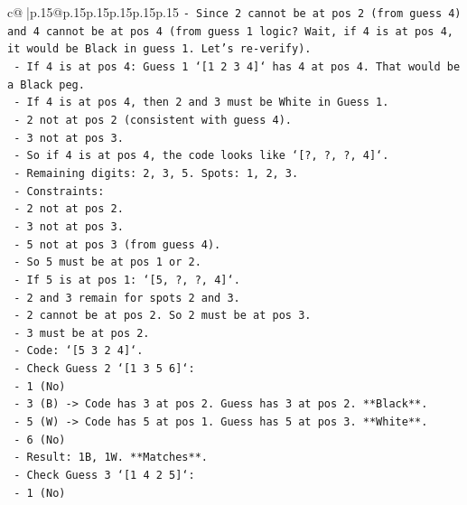 \documentclass{article}
\begin{document}
{\begin{supertabular}{c@{$\;$}|p{.15\linewidth}@{}p{.15\linewidth}p{.15\linewidth}p{.15\linewidth}p{.15\linewidth}p{.15\linewidth}}
{{{\texttt{{-}   Since 2 cannot be at pos 2 (from guess 4) and 4 cannot be at pos 4 (from guess 1 logic? Wait, if 4 is at pos 4, it would be Black in guess 1. Let's re{-}verify).} \\
\texttt{    {-}   If 4 is at pos 4: Guess 1 `{[}1 2 3 4{]}` has 4 at pos 4. That would be a Black peg.} \\
\texttt{    {-}   If 4 is at pos 4, then 2 and 3 must be White in Guess 1.} \\
\texttt{        {-}   2 not at pos 2 (consistent with guess 4).} \\
\texttt{        {-}   3 not at pos 3.} \\
\texttt{    {-}   So if 4 is at pos 4, the code looks like `{[}?, ?, ?, 4{]}`.} \\
\texttt{    {-}   Remaining digits: 2, 3, 5. Spots: 1, 2, 3.} \\
\texttt{    {-}   Constraints:} \\
\texttt{        {-}   2 not at pos 2.} \\
\texttt{        {-}   3 not at pos 3.} \\
\texttt{        {-}   5 not at pos 3 (from guess 4).} \\
\texttt{    {-}   So 5 must be at pos 1 or 2.} \\
\texttt{    {-}   If 5 is at pos 1: `{[}5, ?, ?, 4{]}`.} \\
\texttt{        {-}   2 and 3 remain for spots 2 and 3.} \\
\texttt{        {-}   2 cannot be at pos 2. So 2 must be at pos 3.} \\
\texttt{        {-}   3 must be at pos 2.} \\
\texttt{        {-}   Code: `{[}5 3 2 4{]}`.} \\
\texttt{        {-}   Check Guess 2 `{[}1 3 5 6{]}`:} \\
\texttt{            {-}   1 (No)} \\
\texttt{            {-}   3 (B) {-}> Code has 3 at pos 2. Guess has 3 at pos 2. **Black**.} \\
\texttt{            {-}   5 (W) {-}> Code has 5 at pos 1. Guess has 5 at pos 3. **White**.} \\
\texttt{            {-}   6 (No)} \\
\texttt{            {-}   Result: 1B, 1W. **Matches**.} \\
\texttt{        {-}   Check Guess 3 `{[}1 4 2 5{]}`:} \\
\texttt{            {-}   1 (No)} \\
}}}
\end{supertabular}}
\end{document}
